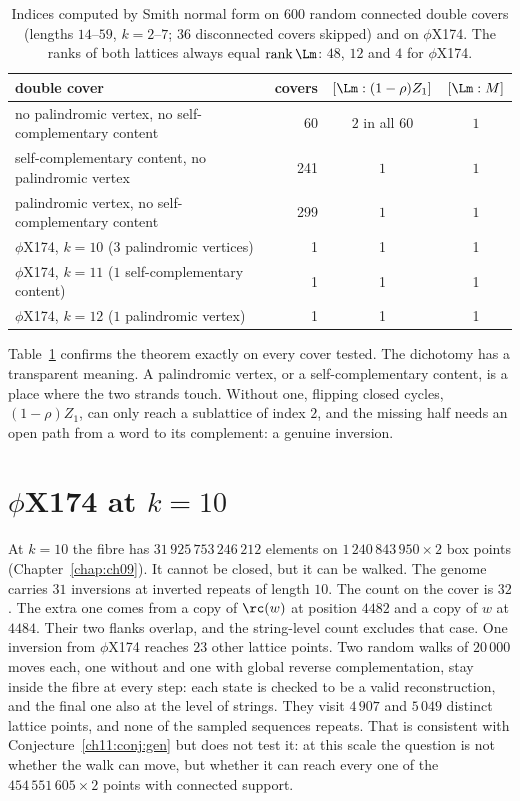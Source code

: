 \begin{table}[t]
\centering\small
\begin{tabular}{lrcc}
\toprule
double cover & covers & $[\Lm:(1-\rho)Z_1]$ & $[\Lm:M]$\\
\midrule
no palindromic vertex, no self-complementary content & 60 & $2$ in all $60$ & $1$\\
self-complementary content, no palindromic vertex & 241 & $1$ & $1$\\
palindromic vertex, no self-complementary content & 299 & $1$ & $1$\\
\midrule
$\phi$X174, $k=10$ ($3$ palindromic vertices) & 1 & 1 & 1\\
$\phi$X174, $k=11$ ($1$ self-complementary content) & 1 & 1 & 1\\
$\phi$X174, $k=12$ ($1$ palindromic vertex) & 1 & 1 & 1\\
\bottomrule
\end{tabular}
\caption{Indices computed by Smith normal form on $600$ random connected double covers (lengths
$14$--$59$, $k=2$--$7$; $36$ disconnected covers skipped) and on $\phi$X174. The ranks of both lattices
always equal $\operatorname{rank}\Lm$: $48$, $12$ and $4$ for $\phi$X174.}\label{ch11:tab:tate}
\end{table}

Table~\ref{ch11:tab:tate} confirms the theorem exactly on every cover tested. The dichotomy has a transparent
meaning. A palindromic vertex, or a self-complementary content, is a place where the two strands
touch. Without one, flipping closed cycles, $(1-\rho)Z_1$, can only reach a sublattice of index $2$, and
the missing half needs an open path from a word to its complement: a genuine inversion.

\section{\texorpdfstring{$\phi$X174 at $k=10$}{phiX174 at k=10}}\label{ch11:sec:phix}

At $k=10$ the fibre has $31\,925\,753\,246\,212$ elements on $1\,240\,843\,950\times2$ box points
(Chapter~\ref{chap:ch09}). It cannot be closed, but it can be walked. The genome carries $31$ inversions at inverted
repeats of length $10$. The count on the cover is $32$. The extra one comes from a copy of $\rc(w)$ at
position $4482$ and a copy of $w$ at $4484$. Their two flanks overlap, and the string-level count
excludes that case. One inversion from $\phi$X174 reaches $23$ other lattice
points. Two random walks of $20\,000$ moves each, one without and one with global reverse
complementation, stay inside the fibre at every step: each state is checked to be a valid
reconstruction, and the final one also at the level of strings. They visit $4\,907$ and $5\,049$
distinct lattice points, and none of the sampled sequences repeats. That is consistent with
Conjecture~\ref{ch11:conj:gen} but does not test it: at this scale the question is not whether the walk can
move, but whether it can reach every one of the $454\,551\,605\times2$ points with connected support.

